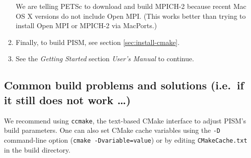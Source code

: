 \documentclass[titlepage,letterpaper,final]{scrartcl}
\begin{document}
\begin{enumerate}
We are telling PETSc to download and build MPICH-2 because recent Mac OS X
versions do not include Open MPI. (This works better than trying to install
Open MPI or MPICH-2 via MacPorts.)

\item Finally, to build PISM, see section \ref{sec:install-cmake}.

\item See the \emph{Getting Started} section \emph{User's Manual} to continue.
\end{enumerate}


\subsection{Common build problems and solutions (i.e.~if it still does not work \dots)}
\label{subsec:config}

We recommend using \texttt{ccmake}, the text-based CMake interface to adjust
PISM's build parameters. One can also set CMake cache variables using the
\texttt{-D} command-line option (\texttt{cmake -Dvariable=value}) or by editing
\texttt{CMakeCache.txt} in the build directory.
\end{document}

